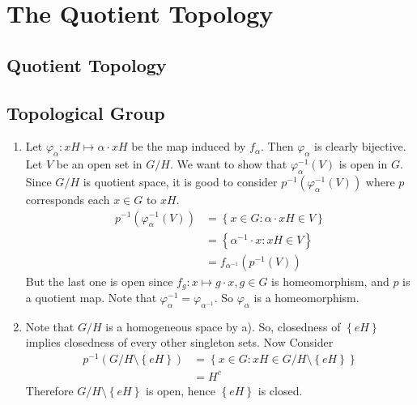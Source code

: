 \setcounter{section}{21}

\section{The Quotient Topology}
\subsection{Quotient Topology}
\subsection{Topological Group}

\begin{problem}[5] \hfill


	\begin{enumerate}[label = (\alph*)]
		\item Let $\varphi_\alpha : xH \mapsto \alpha \cdot x H$ be the map induced by $f_\alpha$. Then $\varphi_\alpha$ is clearly bijective. Let $V$ be an open set in $G/H$. We want to show that $\varphi_\alpha^{-1}\left( V \right)$ is open in $G$. Since $G/H$ is quotient space, it is good to consider $p^{-1}\left( \varphi_\alpha^{-1} \left( V \right) \right)$ where $p$ corresponds each $x\in G$ to $xH$. 
			\begin{equation*}
				\begin{split}
					p^{-1}\left( \varphi_\alpha ^{-1} \left( V \right) \right) & = \left\{ x \in G : \alpha \cdot x H \in V \right\} \\
					& = \left\{ \alpha^{-1} \cdot x : xH \in V \right\} \\
					& = f_{\alpha^{-1}}\left( p^{-1}\left( V \right) \right)
				\end{split}
				\label{<+label+>}
			\end{equation*}
		But the last one is open since $f_g : x \mapsto g\cdot x, g \in G$ is homeomorphism, and $p$ is a quotient map.
		Note that $\varphi_\alpha ^{-1} = \varphi_{\alpha^{-1}}$. So $\varphi_\alpha$ is a homeomorphism. 

	\item Note that $G/H$ is a homogeneous space by a). So, closedness of $\left\{ eH \right\}$ implies closedness of every other singleton sets. Now Consider
	\begin{equation*}
		\begin{split}
			p^{-1}\left( G/H \setminus \left\{ eH \right\} \right) & = \left\{ x \in G : xH \in G/H \setminus \left\{ eH \right\} \right\} \\
		& = H^c
		\end{split}
		\label{<+label+>}
	\end{equation*}
	Therefore $G/H \setminus \left\{ eH \right\}$ is open, hence $\left\{ eH \right\}$ is closed.


\end{enumerate}
\end{problem}
